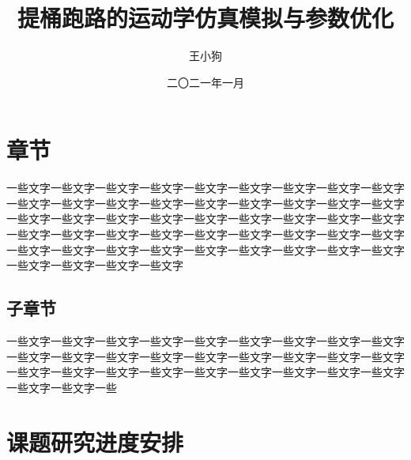 \documentclass[supercite, winfont]{HustGraduProposal}
\title{提桶跑路的运动学仿真模拟与参数优化} %
\author{王小狗} %
\date{二〇二一年一月} %
\begin{document}
    \maketitle
    \clearpage
	\pagestyle{main}
    \section{章节}
	一些文字一些文字一些文字一些文字一些文字一些文字一些文字一些文字一些文字一些文字一些文字一些文字一些文字一些文字一些文字一些文字一些文字一些文字一些文字一些文字一些文字一些文字一些文字一些文字一些文字一些文字一些文字一些文字一些文字一些文字一些文字一些文字一些文字一些文字一些文字一些文字一些文字一些文字一些文字一些文字一些文字一些文字一些文字一些文字一些文字一些文字一些文字一些文字一些文字
	\subsection{子章节}
	一些文字一些文字一些文字一些文字一些文字一些文字一些文字一些文字一些文字一些文字一些文字一些文字一些文字一些文字一些文字一些文字一些文字一些文字一些文字一些文字一些文字一些文字一些文字一些文字一些文字一些文字一些文字一些文字一些文字一些
    \section{课题研究进度安排}
	

	\evasheet	
	
\end{document}
